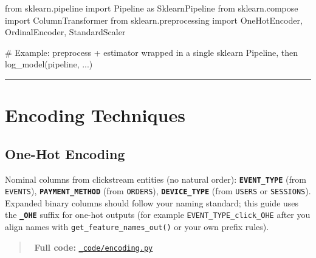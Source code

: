 \documentclass[
  letterpaper,
  DIV=11,
  numbers=noendperiod]{scrreprt}
\newenvironment{Shaded}{\begin{snugshade}}{\end{snugshade}}
\newcommand{\CommentTok}[1]{\textcolor[rgb]{0.37,0.37,0.37}{#1}}
\newcommand{\ImportTok}[1]{\textcolor[rgb]{0.00,0.46,0.62}{#1}}
\newcommand{\NormalTok}[1]{\textcolor[rgb]{0.00,0.23,0.31}{#1}}
\begin{document}
\begin{Shaded}
\begin{Highlighting}[]
\ImportTok{from}\NormalTok{ sklearn.pipeline }\ImportTok{import}\NormalTok{ Pipeline }\ImportTok{as}\NormalTok{ SklearnPipeline}
\ImportTok{from}\NormalTok{ sklearn.compose }\ImportTok{import}\NormalTok{ ColumnTransformer}
\ImportTok{from}\NormalTok{ sklearn.preprocessing }\ImportTok{import}\NormalTok{ OneHotEncoder, OrdinalEncoder, StandardScaler}

\CommentTok{\# Example: preprocess + estimator wrapped in a single sklearn Pipeline, then log\_model(pipeline, ...)}
\end{Highlighting}
\end{Shaded}

\begin{center}\rule{0.5\linewidth}{0.5pt}\end{center}

\hypertarget{encoding-techniques}{%
\section{Encoding Techniques}\label{encoding-techniques}}

\hypertarget{one-hot-encoding}{%
\subsection{One-Hot Encoding}\label{one-hot-encoding}}

Nominal columns from clickstream entities (no natural order):
\textbf{\texttt{EVENT\_TYPE}} (from \texttt{EVENTS}),
\textbf{\texttt{PAYMENT\_METHOD}} (from \texttt{ORDERS}),
\textbf{\texttt{DEVICE\_TYPE}} (from \texttt{USERS} or
\texttt{SESSIONS}). Expanded binary columns should follow your naming
standard; this guide uses the \textbf{\texttt{\_OHE}} suffix for one-hot
outputs (for example \texttt{EVENT\_TYPE\_click\_OHE} after you align
names with \texttt{get\_feature\_names\_out()} or your own prefix
rules).

\begin{quote}
📁 \textbf{Full code:}
\href{_code/encoding.py}{\texttt{\_code/encoding.py}}
\end{quote}
\end{document}
